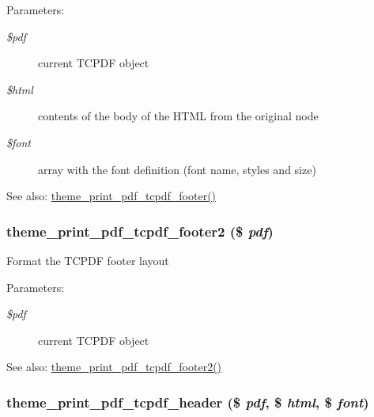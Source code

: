 \begin{Desc}
\item[Parameters:]
\begin{description}
\item[{\em \$pdf}]current TCPDF object \item[{\em \$html}]contents of the body of the HTML from the original node \item[{\em \$font}]array with the font definition (font name, styles and size) \end{description}
\end{Desc}
\begin{Desc}
\item[See also:]\hyperlink{print__pdf_8pages_8inc_25f419982a26a07b6a35d7756a432b4e}{theme\_\-print\_\-pdf\_\-tcpdf\_\-footer()} \end{Desc}
\hypertarget{print__pdf_8pages_8inc_54ec83c33978bd1494667eef3d74fb48}{
\subsubsection[{theme\_\-print\_\-pdf\_\-tcpdf\_\-footer2}]{\setlength{\rightskip}{0pt plus 5cm}theme\_\-print\_\-pdf\_\-tcpdf\_\-footer2 (\$ {\em pdf})}}
\label{print__pdf_8pages_8inc_54ec83c33978bd1494667eef3d74fb48}


Format the TCPDF footer layout

\begin{Desc}
\item[Parameters:]
\begin{description}
\item[{\em \$pdf}]current TCPDF object \end{description}
\end{Desc}
\begin{Desc}
\item[See also:]\hyperlink{print__pdf_8pages_8inc_54ec83c33978bd1494667eef3d74fb48}{theme\_\-print\_\-pdf\_\-tcpdf\_\-footer2()} \end{Desc}
\hypertarget{print__pdf_8pages_8inc_2d29742376ed00838f80a3920bc8c37b}{
\subsubsection[{theme\_\-print\_\-pdf\_\-tcpdf\_\-header}]{\setlength{\rightskip}{0pt plus 5cm}theme\_\-print\_\-pdf\_\-tcpdf\_\-header (\$ {\em pdf}, \/  \$ {\em html}, \/  \$ {\em font})}}
\label{print__pdf_8pages_8inc_2d29742376ed00838f80a3920bc8c37b}


